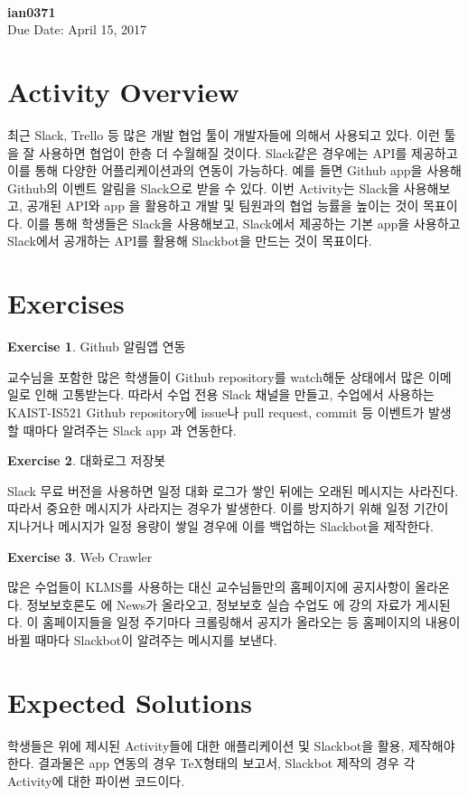 \documentclass[a4paper, 11pt]{article}
\theoremstyle{definition}
\newtheorem{exercise}{Exercise}
\begin{document}
 \\
         {\phantom{} \hfill \textbf{ian0371}} \\
         {\phantom{} \hfill Due Date: April 15, 2017} \\

\section{Activity Overview}
최근 Slack, Trello 등 많은 개발 협업 툴이 개발자들에 의해서 사용되고 있다. 이런 툴을 잘 사용하면 협업이 한층 더 수월해질 것이다. Slack같은 경우에는 API를 제공하고 이를 통해 다양한 어플리케이션과의 연동이 가능하다. 예를 들면 Github app을 사용해 Github의 이벤트 알림을 Slack으로 받을 수 있다. 이번 Activity는 Slack을 사용해보고, 공개된 API와 app \cite{SlackAPI}을 활용하고 개발 및 팀원과의 협업 능률을 높이는 것이 목표이다. 이를 통해 학생들은 Slack을 사용해보고, Slack에서 제공하는 기본 app을 사용하고 Slack에서 공개하는 API를 활용해 Slackbot을 만드는 것이 목표이다.


\section{Exercises}

\begin{exercise}
Github 알림앱 연동

교수님을 포함한 많은 학생들이 Github repository를 watch해둔 상태에서 많은 이메일로 인해 고통받는다.
따라서 수업 전용 Slack 채널을 만들고, 수업에서 사용하는 KAIST-IS521 Github repository에 issue나 pull request, commit 등 이벤트가 발생할 때마다 알려주는 Slack app \cite{GithubApp}과 연동한다. 

\end{exercise}

\begin{exercise}
대화로그 저장봇

Slack 무료 버전을 사용하면 일정 대화 로그가 쌓인 뒤에는 오래된 메시지는 사라진다. 따라서 중요한 메시지가 사라지는 경우가 발생한다. 이를 방지하기 위해 일정 기간이 지나거나 메시지가 일정 용량이 쌓일 경우에 이를 백업하는 Slackbot을 제작한다.

\end{exercise}

\begin{exercise}
Web Crawler

많은 수업들이 KLMS를 사용하는 대신 교수님들만의 홈페이지에 공지사항이 올라온다. 정보보호론도 \cite{IS511}에 News가 올라오고,  정보보호 실습 수업도 \cite{IS512}에 강의 자료가 게시된다. 이 홈페이지들을 일정 주기마다 크롤링해서 공지가 올라오는 등 홈페이지의 내용이 바뀔 때마다 Slackbot이 알려주는 메시지를 보낸다.

\end{exercise}

\section{Expected Solutions}

학생들은 위에 제시된 Activity들에 대한 애플리케이션 및 Slackbot을 활용, 제작해야 한다. 결과물은 app 연동의 경우 \TeX 형태의 보고서, Slackbot 제작의 경우 각 Activity에 대한 파이썬 코드이다.




\end{document}
